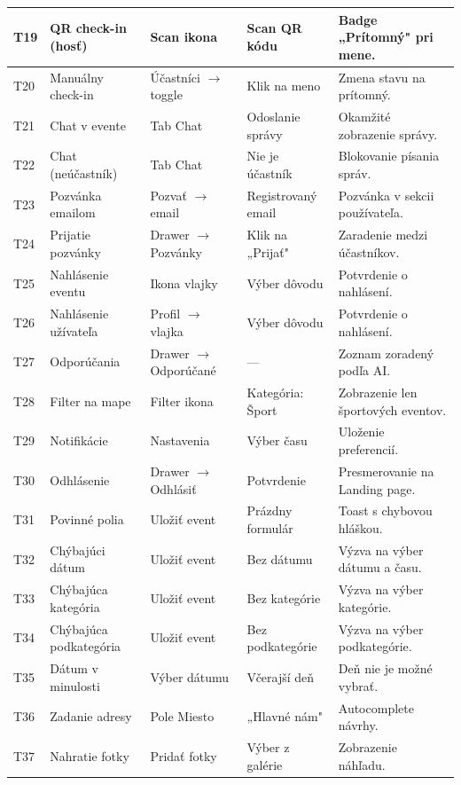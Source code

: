 \documentclass[12pt,a4paper]{article}
\begin{document}
\begin{tabularx}{\textwidth}{@{} l >{\RaggedRight}p{2.5cm} >{\RaggedRight}p{3cm} >{\RaggedRight}p{2.5cm} >{\RaggedRight}X @{} }
T19 & QR check-in (hosť) & Scan ikona & Scan QR kódu & Badge „Prítomný" pri mene. \\ \midrule
T20 & Manuálny check-in & Účastníci $\rightarrow$ toggle & Klik na meno & Zmena stavu na prítomný. \\ \midrule
T21 & Chat v evente & Tab Chat & Odoslanie správy & Okamžité zobrazenie správy. \\ \midrule
T22 & Chat (neúčastník) & Tab Chat & Nie je účastník & Blokovanie písania správ. \\ \midrule
T23 & Pozvánka emailom & Pozvať $\rightarrow$ email & Registrovaný email & Pozvánka v sekcii používateľa. \\ \midrule
T24 & Prijatie pozvánky & Drawer $\rightarrow$ Pozvánky & Klik na „Prijať" & Zaradenie medzi účastníkov. \\ \midrule
T25 & Nahlásenie eventu & Ikona vlajky & Výber dôvodu & Potvrdenie o nahlásení. \\ \midrule
T26 & Nahlásenie užívateľa & Profil $\rightarrow$ vlajka & Výber dôvodu & Potvrdenie o nahlásení. \\ \midrule
T27 & Odporúčania & Drawer $\rightarrow$ Odporúčané & --- & Zoznam zoradený podľa AI. \\ \midrule
T28 & Filter na mape & Filter ikona & Kategória: Šport & Zobrazenie len športových eventov. \\ \midrule
T29 & Notifikácie & Nastavenia & Výber času & Uloženie preferencií. \\ \midrule
T30 & Odhlásenie & Drawer $\rightarrow$ Odhlásiť & Potvrdenie & Presmerovanie na Landing page. \\ \midrule
T31 & Povinné polia & Uložiť event & Prázdny formulár & Toast s chybovou hláškou. \\ \midrule
T32 & Chýbajúci dátum & Uložiť event & Bez dátumu & Výzva na výber dátumu a času. \\ \midrule
T33 & Chýbajúca kategória & Uložiť event & Bez kategórie & Výzva na výber kategórie. \\ \midrule
T34 & Chýbajúca podkategória & Uložiť event & Bez podkategórie & Výzva na výber podkategórie. \\ \midrule
T35 & Dátum v minulosti & Výber dátumu & Včerajší deň & Deň nie je možné vybrať. \\ \midrule
T36 & Zadanie adresy & Pole Miesto & „Hlavné nám" & Autocomplete návrhy. \\ \midrule
T37 & Nahratie fotky & Pridať fotky & Výber z galérie & Zobrazenie náhľadu. \\ \midrule

\end{tabularx}
\end{document}
